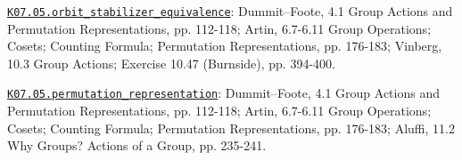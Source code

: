 \par\smallskip\noindent\hypertarget{src:K07.05.orbit_stabilizer_equivalence}{}\label{src:K07.05.orbit_stabilizer_equivalence}\hyperref[K07.05.orbit_stabilizer_equivalence]{\texttt{K07.05.orbit\_stabilizer\_equivalence}}: Dummit--Foote, 4.1 Group Actions and Permutation Representations, pp. 112-118; Artin, 6.7-6.11 Group Operations; Cosets; Counting Formula; Permutation Representations, pp. 176-183; Vinberg, 10.3 Group Actions; Exercise 10.47 (Burnside), pp. 394-400.
\par\smallskip\noindent\hypertarget{src:K07.05.permutation_representation}{}\label{src:K07.05.permutation_representation}\hyperref[K07.05.permutation_representation]{\texttt{K07.05.permutation\_representation}}: Dummit--Foote, 4.1 Group Actions and Permutation Representations, pp. 112-118; Artin, 6.7-6.11 Group Operations; Cosets; Counting Formula; Permutation Representations, pp. 176-183; Aluffi, 11.2 Why Groups? Actions of a Group, pp. 235-241.
